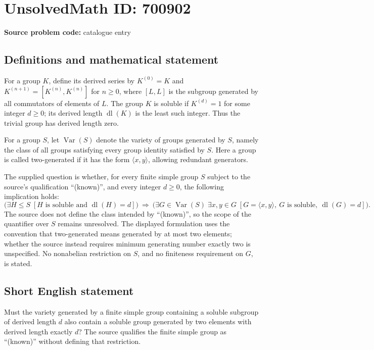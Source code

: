 \documentclass[11pt]{article}
\begin{document}
\section*{UnsolvedMath ID: 700902}
\textbf{Source problem code:} catalogue entry
\subsection{Definitions and mathematical statement}
For a group \(K\), define its derived series by \(K^{(0)}=K\) and \(K^{(n+1)}=[K^{(n)},K^{(n)}]\) for \(n\geq 0\), where \([L,L]\) is the subgroup generated by all commutators of elements of \(L\). The group \(K\) is soluble if \(K^{(d)}=1\) for some integer \(d\geq 0\); its derived length \(\operatorname{dl}(K)\) is the least such integer. Thus the trivial group has derived length zero.

For a group \(S\), let \(\operatorname{Var}(S)\) denote the variety of groups generated by \(S\), namely the class of all groups satisfying every group identity satisfied by \(S\). Here a group is called two-generated if it has the form \(\langle x,y\rangle\), allowing redundant generators.

The supplied question is whether, for every finite simple group \(S\) subject to the source's qualification ``(known)'', and every integer \(d\geq 0\), the following implication holds:
\[
\bigl(\exists H\leq S\;[H\text{ is soluble and }\operatorname{dl}(H)=d]\bigr)
\ \Longrightarrow\ 
\bigl(\exists G\in\operatorname{Var}(S)\;\exists x,y\in G\;
[G=\langle x,y\rangle,\ G\text{ is soluble},\ \operatorname{dl}(G)=d]\bigr).
\]
The source does not define the class intended by ``(known)'', so the scope of the quantifier over \(S\) remains unresolved. The displayed formulation uses the convention that two-generated means generated by at most two elements; whether the source instead requires minimum generating number exactly two is unspecified. No nonabelian restriction on \(S\), and no finiteness requirement on \(G\), is stated.
\subsection{Short English statement}
Must the variety generated by a finite simple group containing a soluble subgroup of derived length \(d\) also contain a soluble group generated by two elements with derived length exactly \(d\)? The source qualifies the finite simple group as ``(known)'' without defining that restriction.
\end{document}

